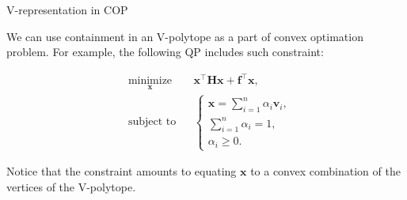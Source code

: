 \documentclass{beamer}
\begin{document}
\begin{frame}{V-representation in COP}
	\begin{flushleft}
		
		We can use containment in an V-polytope as a part of convex optimation problem. For example, the following QP includes such constraint:
		
		\begin{equation}
			\begin{aligned}
				& \underset{\mathbf{x}}{\text{minimize}}
				& & \mathbf{x}^\top \mathbf{H} \mathbf{x} + \mathbf{f}^\top\mathbf{x}, \\
				& \text{subject to}
				& & \begin{cases}
					\mathbf{x} = \sum\limits_{i=1}^{n} \alpha_i  \mathbf{v}_i, \\
					\sum\limits_{i=1}^{n} \alpha_i = 1, \\
					\alpha_i \geq 0.
				\end{cases}
			\end{aligned}
		\end{equation}
		
		Notice that the constraint amounts to equating $\mathbf{x}$ to a convex combination of the vertices of the V-polytope.
		
	\end{flushleft}
\end{frame}
\end{document}
